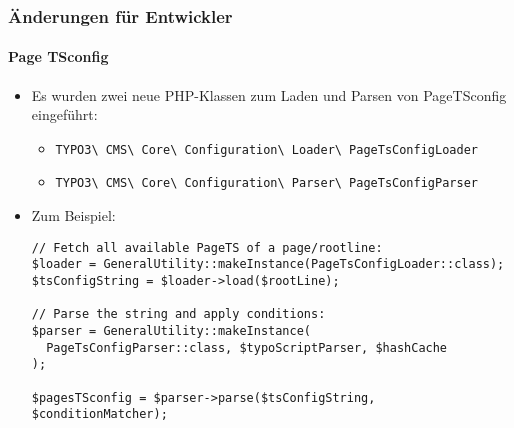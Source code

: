 
\begin{frame}[fragile]
	\frametitle{Änderungen für Entwickler}
	\framesubtitle{Page TSconfig}

	\lstset{basicstyle=\tiny\ttfamily}

	\begin{itemize}
		\item Es wurden zwei neue PHP-Klassen zum Laden und Parsen von PageTSconfig eingeführt:
			\begin{itemize}\smaller
				\item \texttt{TYPO3\textbackslash
					CMS\textbackslash
					Core\textbackslash
					Configuration\textbackslash
					Loader\textbackslash
					PageTsConfigLoader}
				\item \texttt{TYPO3\textbackslash
					CMS\textbackslash
					Core\textbackslash
					Configuration\textbackslash
					Parser\textbackslash
					PageTsConfigParser}
			\end{itemize}

		\item Zum Beispiel:
\begin{lstlisting}
// Fetch all available PageTS of a page/rootline:
$loader = GeneralUtility::makeInstance(PageTsConfigLoader::class);
$tsConfigString = $loader->load($rootLine);

// Parse the string and apply conditions:
$parser = GeneralUtility::makeInstance(
  PageTsConfigParser::class, $typoScriptParser, $hashCache
);

$pagesTSconfig = $parser->parse($tsConfigString, $conditionMatcher);
\end{lstlisting}

	\end{itemize}

\end{frame}


